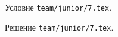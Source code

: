 \problem{}
Условие \texttt{team/junior/7.tex}.

\solution Решение \texttt{team/junior/7.tex}.
\endproblem
